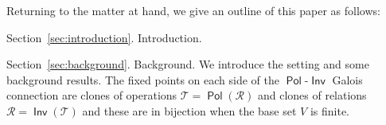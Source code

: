 \documentclass[11pt, a4paper, twoside,leqno]{amsart}
\numberwithin{equation}{section}
\theoremstyle{plain}
\theoremstyle{definition}
\DeclareMathOperator{\Pol}{\mathsf{Pol}}
\DeclareMathOperator{\Inv}{\mathsf{Inv}}
\begin{document}
Returning to the matter at hand,
%
%
%
we give an outline of this paper as follows:


Section~\ref{sec:introduction}. Introduction.


   Section~\ref{sec:background}.
   Background. We introduce the setting and some background results. %
  The fixed points on each side of the \(\Pol\)-\(\Inv\) Galois
  connection are clones of operations
\(\mathscr{T} = \Pol(\mathscr{R}
  )
  \) and clones of relations \(\mathscr{R}= \Inv(\mathscr{T}
  )\)
  and these are in bijection when the base set \(V\) is finite.
\end{document}
